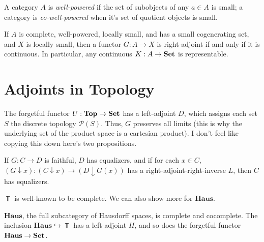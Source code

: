 \begin{definition}\label{dfn:5.6}
	A category $A$ is \emph{well-powered} if the set of subobjects of any $a\in A$ is small; a category is \emph{co-well-powered} when it's set of quotient objects is small.
\end{definition}
\begin{corollary}\label{cor:5.4}
	If $A$ is complete, well-powered, locally small, and has a small cogenerating set, and $X$ is locally small, then a functor $G : A \to X$ is right-adjoint if and only if it is continuous. In particular, any continuous $K : A \to \mathbf{Set} $ is representable.
\end{corollary}

\section{Adjoints in Topology}

The forgetful functor $U : \mathbf{Top}  \to \mathbf{Set} $ has a left-adjoint $D$, which assigns each set $S$ the discrete topology $\mathcal{P} (S)$. Thus, $G$ preserves all limits (this is why the underlying set of the product space is a cartesian product). I don't feel like copying this down here's two propositions.

\begin{proposition}\label{prp:5.2}
	If $G : C \to D$ is faithful, $D$ has equalizers, and if for each $x\in C$, $(G\downarrow x): (C\downarrow x) \to (D\downarrow G(x))$ has a right-adjoint-right-inverse $L$, then $C$ has equalizers.
\end{proposition}

$\Top $ is well-known to be complete. We can also show more for $\mathbf{Haus} $.

\begin{proposition}\label{prp:5.3}
	$\mathbf{Haus} $, the full subcategory of Hausdorff spaces, is complete and cocomplete. The inclusion $\mathbf{Haus} \hookrightarrow \Top $ has a left-adjoint $H$, and so does the forgetful functor $\mathbf{Haus}  \to \mathbf{Set} $.
\end{proposition}

